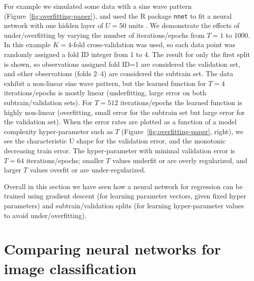 \documentclass[12pt]{article}
\begin{document}
For example we simulated some data with a sine wave pattern
(Figure~\ref{fig:overfitting-paper}), and used the R package
\texttt{nnet} to fit a neural network with one hidden layer of $U=50$
units \citep{Ripley2002}. We demonstrate the effects of
under/overfitting by varying the number of iterations/epochs from
$T=1$ to 1000. In this example $K=4$-fold cross-validation was used,
so each data point was randomly assigned a fold ID integer from 1 to
4. The result for only the first split is shown, so observations
assigned fold ID=1 are considered the validation set, and other
observations (folds 2--4) are considered the subtrain set. The data
exhibit a non-linear sine wave pattern, but the learned function for
$T=4$ iterations/epochs is mostly linear (underfitting, large error on
both subtrain/validation sets). For $T=512$ iterations/epochs the
learned function is highly non-linear (overfitting, small error for
the subtrain set but large error for the validation set). When the
error rates are plotted as a function of a model complexity
hyper-parameter such as $T$ (Figure~\ref{fig:overfitting-paper},
right), we see the characteristic U shape for the validation error,
and the monotonic decreasing train error. The hyper-parameter with
minimal validation error is $T=64$ iterations/epochs; smaller $T$
values underfit or are overly regularized, and larger $T$ values
overfit or are under-regularized.

Overall in this section we have seen how a neural network for
regression can be trained using gradient descent (for learning
parameter vectors, given fixed hyper parameters) and
subtrain/validation splits (for learning hyper-parameter values to
avoid under/overfitting).

\section{Comparing neural networks for image classification}
\end{document}
